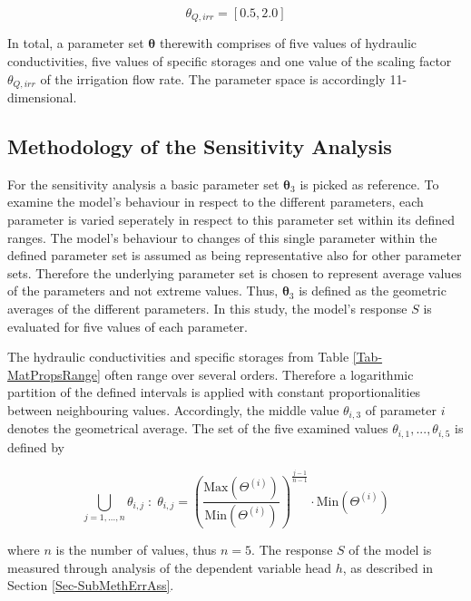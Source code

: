 \begin{equation}
    \theta_{Q,irr} = \left[ 0.5, 2.0 \right]
\end{equation}

In total, a parameter set $\bm{\theta}$ therewith comprises of five values of hydraulic conductivities, five values of specific storages and one value of the scaling factor $\theta_{Q,irr}$ of the irrigation flow rate. The parameter space is accordingly 11-dimensional.


\subsection{Methodology of the Sensitivity Analysis}
\label{Sec-SubMethSAna}

For the sensitivity analysis a basic parameter set $\bm{\theta}_3$ is picked as reference. To examine the model's behaviour in respect to the different parameters, each parameter is varied seperately in respect to this parameter set within its defined ranges. The model's behaviour to changes of this single parameter within the defined parameter set is assumed as being representative also for other parameter sets. Therefore the underlying parameter set is chosen to represent average values of the parameters and not extreme values. Thus, $\bm{\theta}_3$ is defined as the geometric averages of the different parameters. In this study, the model's response $S$ is evaluated for five values of each parameter. 
    
The hydraulic conductivities and specific storages from Table \ref{Tab-MatPropsRange} often range over several orders. Therefore a logarithmic partition of the defined intervals is applied with constant proportionalities between neighbouring values. Accordingly, the middle value $\theta_{i,3}$ of parameter $i$ denotes the geometrical average. The set of the five examined values $\theta_{i,1},...,\theta_{i,5}$ is defined by

\begin{equation}
    \label{Eq-ParamValCalc}
    \bigcup_{j=1,...,n} \theta_{i,j} \; : \; \theta_{i,j} = \left( \frac{\textrm{Max}(\Theta^{(i)})}{\textrm{Min}(\Theta^{(i)})} \right) ^{\frac{j-1}{n-1}} \cdot \textrm{Min}(\Theta^{(i)})
\end{equation}

\noindent where $n$ is the number of values, thus $n=5$. The response $S$ of the model is measured through analysis of the dependent variable head $h$, as described in Section \ref{Sec-SubMethErrAss}.

